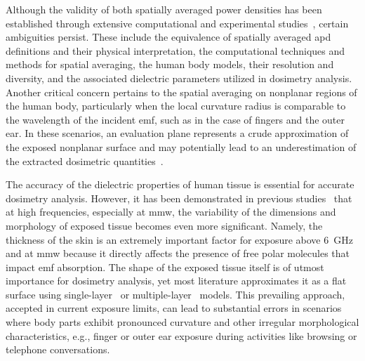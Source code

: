 Although the validity of both spatially averaged power densities has been established through extensive computational and experimental studies~\cite{Hirata2021Human}, certain ambiguities persist.
These include the equivalence of spatially averaged \gls{apd} definitions and their physical interpretation, the computational techniques and methods for spatial averaging, the human body models, their resolution and diversity, and the associated dielectric parameters utilized in dosimetry analysis.
Another critical concern pertains to the spatial averaging on nonplanar regions of the human body, particularly when the local curvature radius is comparable to the wavelength of the incident \gls{emf}, such as in the case of fingers and the outer ear.
In these scenarios, an evaluation plane represents a crude approximation of the exposed nonplanar surface and may potentially lead to an underestimation of the extracted dosimetric quantities~\cite{Sacco2022Exposure}.

The accuracy of the dielectric properties of human tissue is essential for accurate dosimetry analysis.
However, it has been demonstrated in previous studies~\cite{Ziskin2018Tissue} that at high frequencies, especially at \gls{mmw}, the variability of the dimensions and morphology of exposed tissue becomes even more significant.
Namely, the thickness of the skin is an extremely important factor for exposure above \SI{6}{\GHz} and at \gls{mmw} because it directly affects the presence of free polar molecules that impact \gls{emf} absorption.
The shape of the exposed tissue itself is of utmost importance for dosimetry analysis, yet most literature approximates it as a flat surface using single-layer~\cite{Poljak2020transmitted,Poljak2020Assessment,Ziane2020Antenna} or multiple-layer~\cite{Foster2018Thermal,He2018RF,Carrasco2019Exposure,Diao2021Effect} models.
This prevailing approach, accepted in current exposure limits, can lead to substantial errors in scenarios where body parts exhibit pronounced curvature and other irregular morphological characteristics, e.g., finger or outer ear exposure during activities like browsing or telephone conversations.

